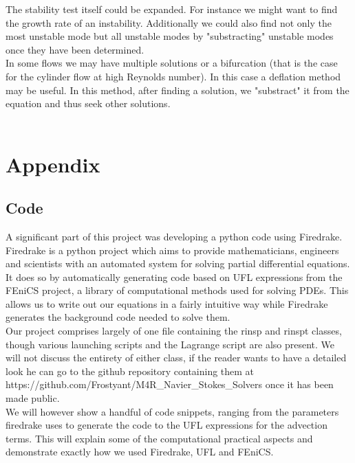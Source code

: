 \documentclass[11pt,twoside,a4paper]{article}
\begin{document}
The stability test itself could be expanded. For instance we might want to find the growth rate of an instability. Additionally we could also find not only the most unstable mode but all unstable modes by "substracting" unstable modes once they have been determined.\\
In some flows we may have multiple solutions or a bifurcation (that is the case for the cylinder flow at high Reynolds number). In this case a deflation method may be useful. In this method, after finding a solution, we "substract" it from the equation and thus seek other solutions.\\
\\


\section{Appendix}
\subsection{Code}
A significant part of this project was developing a python code using Firedrake.
Firedrake is a python project which aims to provide mathematicians, engineers and scientists with an automated system for solving partial differential equations.\\
It does so by automatically generating code based on UFL expressions from the FEniCS project, a library of computational methods used for solving PDEs. This allows us to write out our equations in a fairly intuitive way while Firedrake generates the background code needed to solve them.\\
Our project comprises largely of one file containing the rinsp and rinspt classes, though various launching scripts and the Lagrange script are also present. We will not discuss the entirety of either class, if the reader wants to have a detailed look he can go to the github repository containing them at https://github.com/Frostyant/M4R\_Navier\_Stokes\_Solvers once it has been made public.\\
We will however show a handful of code snippets, ranging from the parameters firedrake uses to generate the code to the UFL expressions for the advection terms. This will explain some of the computational practical aspects and demonstrate exactly how we used Firedrake, UFL and FEniCS.
\end{document}
